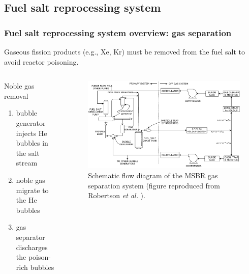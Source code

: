 \subsection{Fuel salt reprocessing system}

\begin{frame}
  \frametitle{Fuel salt reprocessing system overview: gas separation}
  Gaseous fission products (e.g., Xe, Kr) must be removed from the fuel salt 
  to avoid reactor
poisoning. 
  
      \begin{columns}
      	\column[t]{4.7cm}
    \begin{block}{Noble gas removal}
      \begin{enumerate}
      	\item bubble generator injects He bubbles in the salt stream
      	\item noble gas migrate to the He bubbles 
      	\item gas separator discharges the poison-rich bubbles
      \end{enumerate}
    \end{block}    	
      	
     	\column[t]{8cm}
  \begin{figure}[t]
	  \centering
	  		\vspace{-8mm}
		\includegraphics[width=\textwidth]{../figures/gas_separation.pdf}
	\caption{Schematic flow diagram of the \gls{MSBR} gas separation system 
	(figure reproduced from Robertson \emph{et al.}  
	\cite{robertson_conceptual_1971}).} 
    \end{figure}

	\end{columns}
\end{frame}


